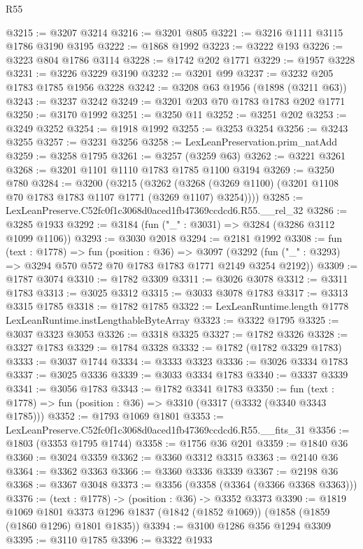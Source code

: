 \begin{lexlean}{R55}
\begin{coremodule}
@3215 := @3207 @3214
@3216 := @3201 @805
@3221 := @3216 @1111 @3115 @1786 @3190 @3195
@3222 := @1868 @1992
@3223 := @3222 @193
@3226 := @3223 @804 @1786 @3114
@3228 := @1742 @202 @1771
@3229 := @1957 @3228
@3231 := @3226 @3229 @3190
@3232 := @3201 @99
@3237 := @3232 @205 @1783 @1785 @1956 @3228
@3242 := @3208 @63 @1956 (@1898 (@3211 @63))
@3243 := @3237 @3242
@3249 := @3201 @203 @70 @1783 @1783 @202 @1771
@3250 := @3170 @1992
@3251 := @3250 @11
@3252 := @3251 @202
@3253 := @3249 @3252
@3254 := @1918 @1992
@3255 := @3253 @3254
@3256 := @3243 @3255
@3257 := @3231 @3256
@3258 := LexLeanPreservation.prim_natAdd
@3259 := @3258 @1795
@3261 := @3257 (@3259 @63)
@3262 := @3221 @3261
@3268 := @3201 @1101 @1110 @1783 @1785 @1100 @3194
@3269 := @3250 @780
@3284 := @3200
    (@3215
      (@3262 (@3268 (@3269 @1100) (@3201 @1108 @70 @1783 @1783 @1107 @1771 (@3269 @1107) @3254))))
@3285 := LexLeanPreserve.C52fc0f1c3068d0aced1fb47369ccdcd6.R55.__rel_32
@3286 := @3285 @1933
@3292 := @3184 (fun ("_" : @3031) => @3284 (@3286 @3112 @1099 @1106))
@3293 := @3030 @2018
@3294 := @2181 @1992
@3308 := fun (text : @1778) =>
  fun (position : @36) =>
  @3097 (@3292 (fun ("_" : @3293) => @3294 @570 @572 @70 @1783 @1783 @1771 @2149 @3254 @2192))
@3309 := @1787 @3074
@3310 := @1782 @3309
@3311 := @3026 @3078
@3312 := @3311 @1783
@3313 := @3025 @3312
@3315 := @3033 @3078 @1783
@3317 := @3313 @3315 @1785
@3318 := @1782 @1785
@3322 := LexLeanRuntime.length @1778 LexLeanRuntime.instLengthableByteArray
@3323 := @3322 @1795
@3325 := @3037 @3323 @3053
@3326 := @3318 @3325
@3327 := @1782 @3326
@3328 := @3327 @1783
@3329 := @1784 @3328
@3332 := @1782 (@1782 @3329 @1783)
@3333 := @3037 @1744
@3334 := @3333 @3323
@3336 := @3026 @3334 @1783
@3337 := @3025 @3336
@3339 := @3033 @3334 @1783
@3340 := @3337 @3339
@3341 := @3056 @1783
@3343 := @1782 @3341 @1783
@3350 := fun (text : @1778) => fun (position : @36) => @3310 (@3317 (@3332 (@3340 @3343 @1785)))
@3352 := @1793 @1069 @1801
@3353 := LexLeanPreserve.C52fc0f1c3068d0aced1fb47369ccdcd6.R55.__fits_31
@3356 := @1803 (@3353 @1795 @1744)
@3358 := @1756 @36 @201
@3359 := @1840 @36
@3360 := @3024 @3359
@3362 := @3360 @3312 @3315
@3363 := @2140 @36
@3364 := @3362 @3363
@3366 := @3360 @3336 @3339
@3367 := @2198 @36
@3368 := @3367 @3048
@3373 := @3356 (@3358 (@3364 (@3366 @3368 @3363)))
@3376 := (text : @1778) -> (position : @36) -> @3352 @3373
@3390 := @1819
    @1069
    @1801
    @3373
    @1296
    @1837
    (@1842 (@1852 @1069))
    (@1858 (@1859 (@1860 @1296) @1801 @1835))
@3394 := @3100 @1286 @356 @1294 @3309
@3395 := @3110 @1785
@3396 := @3322 @1933

\end{coremodule}
\end{lexlean}
